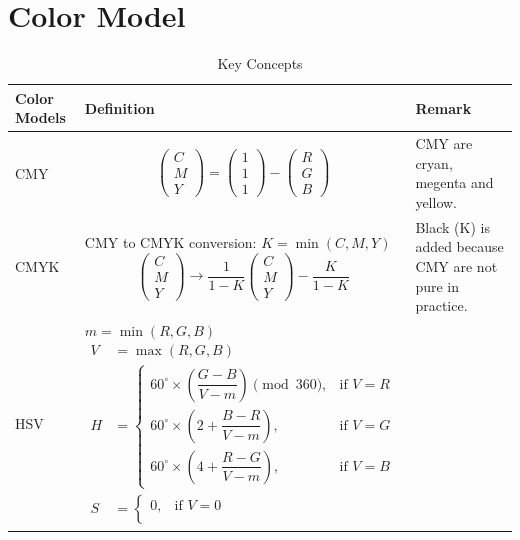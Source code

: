 \documentclass[UTF8]{ctexart}
\begin{document}
\section*{Color Model}
\begin{table}[h]
	\centering
	\caption{Key Concepts}
	\begin{tabularx}{\textwidth}{| l | X | X |} %
	\hline
	\textbf{Color Models} & \textbf{Definition} & \textbf{Remark} \\
	\hline
	CMY  
	& $$\begin{pmatrix}
		C \\ M \\ Y
	\end{pmatrix} = \begin{pmatrix}
		1 \\ 1\\ 1 
	\end{pmatrix} - \begin{pmatrix}
		R \\ G\\ B
	\end{pmatrix}$$   
	&  CMY are cryan, megenta and yellow.   \\
	\hline
	CMYK  
	& CMY to CMYK conversion: $K = \min(C, M, Y)$ $$ \begin{pmatrix}
		C \\ M \\ Y
	\end{pmatrix} \rightarrow \frac{1}{1-K} \begin{pmatrix}C \\ M \\ Y \end{pmatrix} - \frac{K}{1-K} $$   
	&  Black (K) is added because CMY are not pure in practice.\\
	\hline
	HSV 
	&  $m = \min(R,G,B)$
	$$
	\begin{aligned}
		V &= \max(R,G,B) \\
		H &= 
		\begin{cases} 
			60^\circ \times \left( \dfrac{G - B}{V - m} \right) \pmod{360}, & \text{if } V = R \\[12pt]
			60^\circ \times \left( 2 + \dfrac{B - R}{V - m} \right), & \text{if } V = G \\[12pt]
			60^\circ \times \left( 4 + \dfrac{R - G}{V - m} \right), & \text{if } V = B
		\end{cases} \\
		S &= 
		\begin{cases} 
			0, & \text{if } V = 0 \\[8pt]

\end{cases}
\end{aligned}$$
\end{tabularx}
\end{table}
\end{document}
